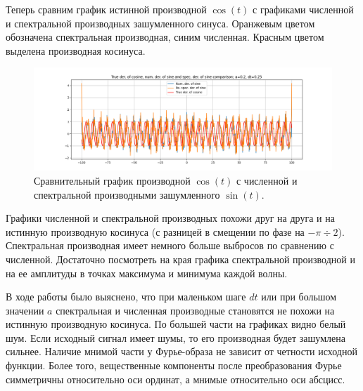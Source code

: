 \documentclass[a4paper, 12pt]{article}
\begin{document}
    
    Теперь сравним график истинной производной $\cos{(t)}$ с графиками численной и спектральной производных зашумленного синуса.
    Оранжевым цветом обозначена спектральная производная, синим численная. Красным цветом выделена производная косинуса.
    \begin{figure}[H]
        \centering
        \includegraphics[scale=0.4]{1_css_comp.png}
        \captionsetup{skip=0pt}
        \caption{Сравнительный график производной $\cos{(t)}$ с численной и спектральной производными зашумленного $\sin{(t)}$.}
        \label{fig:css_comp}
    \end{figure}


    Графики численной и спектральной производных похожи друг на друга и на истинную производную косинуса (с разницей в смещении
    по фазе на $-\pi\div 2$). Спектральная производная имеет немного больше выбросов по сравнению с численной. Достаточно посмотреть
    на края графика спектральной производной и на ее амплитуды в точках максимума и минимума каждой волны.


    В ходе работы было выяснено, что при маленьком шаге $dt$ или при большом значении $a$ спектральная и численная производные
    становятся не похожи на истинную производную косинуса. По большей части на графиках видно белый шум. Если исходный сигнал
    имеет шумы, то его производная будет зашумлена сильнее. Наличие мнимой части у Фурье-образа не зависит от четности исходной
    функции. Более того, вещественные компоненты после преобразования Фурье симметричны относительно оси ординат, а мнимые относительно
    оси абсцисс.
\end{document}
